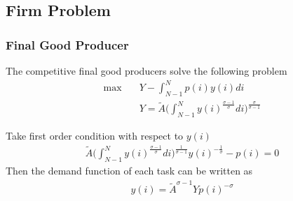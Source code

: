 \documentclass[12pt]{article}
\begin{document}
\begin{appendices}

\section{Firm Problem}

\subsubsection*{Final Good Producer}
The competitive final good producers solve the following problem 
\begin{align*}
\max \quad & Y-\int_{N-1}^Np(i)y(i)di \\
&Y = \tilde{A}\Big(\int_{N-1}^{N}y(i)^{\frac{\sigma-1}{\sigma}}di\Big)^{\frac{\sigma}{\sigma-1}}
\end{align*}

Take first order condition with respect to $y(i)$
\begin{align*}
\tilde{A}\Big(\int_{N-1}^{N}y(i)^{\frac{\sigma-1}{\sigma}}di\Big)^{\frac{1}{\sigma-1}}y(i)^{-\frac{1}{\sigma}}-p(i) = 0
\end{align*}
Then the demand function of each task can be written as 
\begin{align*}
y(i) = \tilde{A}^{\sigma-1}Yp(i)^{-\sigma}
\end{align*}


\end{appendices}
\end{document}
